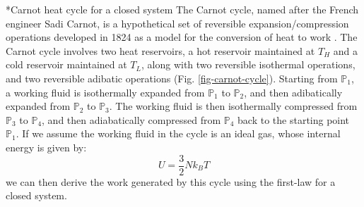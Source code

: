 \documentclass[11pt]{article}
\makeatletter
\theoremstyle{definition}
\renewcommand\subsection{\@startsection
	{subsection}{2}{0mm}
	{-0.05in}
	{0.5\baselineskip}
	{\normalfont\normalsize\bfseries}}
\makeatother
\begin{document}
\subsection*{Carnot heat cycle for a closed system}
The Carnot cycle, named after the French engineer Sadi Carnot, is a hypothetical set of reversible expansion/compression operations
developed in 1824 as a model for the conversion of heat to work \cite{CARNOT_1824}.
The Carnot cycle involves two heat reservoirs, a hot reservoir maintained at $T_{H}$ and a cold reservoir maintained at $T_{L}$, along with two reversible isothermal operations,
and two reversible adibatic operations (Fig. \ref{fig-carnot-cycle}).
Starting from $\mathbb{P}_{1}$, a working fluid is
isothermally expanded from $\mathbb{P}_{1}$ to $\mathbb{P}_{2}$, and then adibatically expanded from $\mathbb{P}_{2}$ to $\mathbb{P}_{3}$.
The working fluid is then isothermally compressed from $\mathbb{P}_{3}$ to $\mathbb{P}_{4}$, and then adiabatically compressed from $\mathbb{P}_{4}$ back to the starting point $\mathbb{P}_{1}$.
If we assume the working fluid in the cycle is an ideal gas, whose internal energy is given by:
\begin{equation}\label{eqn:internal-energy-for-ideal-gas}
U = \frac{3}{2}Nk_{B}T
\end{equation} we can then derive the work generated by this cycle using the first-law for a closed system.
\end{document}
